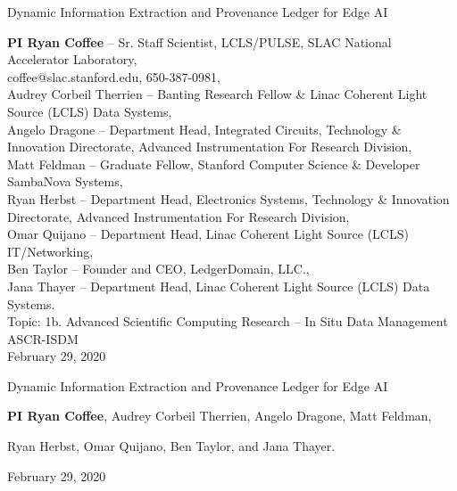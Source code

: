 \documentclass{article}
\begin{document}
\centerline{
\large
Dynamic Information Extraction and Provenance Ledger for Edge AI
}
\normalsize
	\noindent\textbf{PI Ryan Coffee} -- Sr. Staff Scientist, LCLS/PULSE, SLAC National Accelerator Laboratory, \\coffee@slac.stanford.edu, 650-387-0981, \\
	Audrey Corbeil Therrien -- Banting Research Fellow \& Linac Coherent Light Source (LCLS) Data Systems,\\
	Angelo Dragone -- Department Head, Integrated Circuits, Technology \& Innovation Directorate, Advanced Instrumentation For Research Division,\\
	Matt Feldman -- Graduate Fellow, Stanford Computer Science \& Developer SambaNova Systems, \\
	Ryan Herbst -- Department Head, Electronics Systems, Technology \& Innovation Directorate, Advanced Instrumentation For Research Division,\\
	Omar Quijano -- Department Head, Linac Coherent Light Source (LCLS) IT/Networking,\\
	Ben Taylor -- Founder and CEO, LedgerDomain, LLC.,\\
	Jana Thayer -- Department Head, Linac Coherent Light Source (LCLS) Data Systems.\\
	Topic: 1b. Advanced Scientific Computing Research -- In Situ Data Management ASCR-ISDM\\
	February 29, 2020\\

\break
\centerline{\large{Dynamic Information Extraction and Provenance Ledger for Edge AI}}
\normalsize
\vspace{0.5\baselineskip}
\centerline{\textbf{PI Ryan Coffee},
Audrey Corbeil Therrien,
Angelo Dragone,
Matt Feldman,}
\centerline{
Ryan Herbst,
Omar Quijano,
Ben Taylor, and 
Jana Thayer.
}
\centerline{February 29, 2020}
\vspace{0.5\baselineskip}
\end{document}
